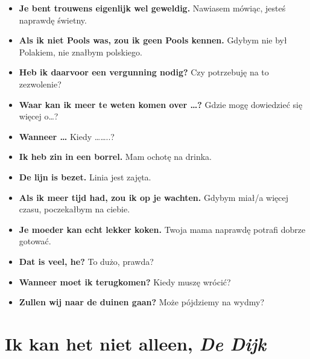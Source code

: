 \documentclass[
]{book}
\providecommand{\tightlist}{%
  \setlength{\itemsep}{0pt}\setlength{\parskip}{0pt}}
\begin{document}
\begin{itemize}
\tightlist
\item
  \textbf{Je bent trouwens eigenlijk wel geweldig.} Nawiasem mówiąc, jesteś naprawdę świetny.\\
\item
  \textbf{Als ik niet Pools was, zou ik geen Pools kennen.} Gdybym nie był Polakiem, nie znałbym polskiego.\\
\item
  \textbf{Heb ik daarvoor een vergunning nodig?} Czy potrzebuję na to zezwolenie?\\
\item
  \textbf{Waar kan ik meer te weten komen over \ldots?} Gdzie mogę dowiedzieć się więcej o\ldots?\\
\item
  \textbf{Wanneer \ldots{}} Kiedy \ldots\ldots..?\\
\item
  \textbf{Ik heb zin in een borrel.} Mam ochotę na drinka.\\
\item
  \textbf{De lijn is bezet.} Linia jest zajęta.\\
\item
  \textbf{Als ik meer tijd had, zou ik op je wachten.} Gdybym miał/a więcej czasu, poczekałbym na ciebie.\\
\item
  \textbf{Je moeder kan echt lekker koken.} Twoja mama naprawdę potrafi dobrze gotować.\\
\item
  \textbf{Dat is veel, he?} To dużo, prawda?\\
\item
  \textbf{Wanneer moet ik terugkomen?} Kiedy muszę wrócić?\\
\item
  \textbf{Zullen wij naar de duinen gaan?} Może pójdziemy na wydmy?
\end{itemize}

\hypertarget{Ik-kan-het-niet-alleen}{%
\section{\texorpdfstring{Ik kan het niet alleen, \emph{De Dijk}}{Ik kan het niet alleen, De Dijk}}\label{Ik-kan-het-niet-alleen}}
\end{document}
